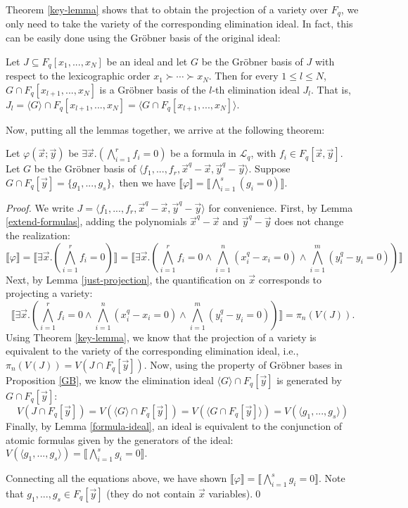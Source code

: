 \documentclass[envcountsect]{llncs}
\begin{document}
Theorem \ref{key-lemma} shows that to obtain the projection of a variety over $F_q$, we only need to take the variety of the corresponding elimination ideal. In fact, this can be easily done using the Gr\"obner basis of the original ideal:

\begin{proposition}\label{GB}
Let $J\subseteq F_q[x_1,...,x_N]$ be an ideal and let $G$ be the Gr\"obner basis of $J$ with respect to the lexicographic order $x_1\succ\cdots\succ x_N$. Then for every $1\leq l\leq N$, $G\cap F_q[x_{l+1},...,x_N]$ is a Gr\"obner basis of the $l$-th elimination ideal $J_l$. That is, $J_l=\langle G\rangle \cap F_q[x_{l+1},...,x_N]=\langle G\cap F_q[x_{l+1},...,x_N]\rangle.$
\end{proposition}

Now, putting all the lemmas together, we arrive at the following theorem:

\begin{theorem}\label{main-theorem}
Let $\varphi(\vec x;\vec y)$ be $\exists \vec x.(\bigwedge_{i=1}^r f_i=0)$ be a formula in $\mathcal{L}_q$, with $f_i\in F_q[\vec x, \vec y]$. Let $G$ be the Gr\"obner basis of $\langle f_1,...,f_r, \vec x^q-\vec x, \vec y^q-\vec y \rangle$. Suppose $G\cap F_q[\vec y] = \{g_1,...,g_s\},$ then we have $\llbracket \varphi \rrbracket = \llbracket \bigwedge_{i=1}^s (g_i=0)\rrbracket.$
\end{theorem}

\begin{proof}
We write $J=\langle f_1,...,f_r,\vec x^q-\vec x, \vec y^q-\vec y\rangle$ for convenience. First, by Lemma \ref{extend-formulas}, adding the polynomials $\vec x^q-\vec x$ and $\vec y^q -\vec y$ does not change the realization:
{$$\llbracket \varphi\rrbracket = \llbracket\exists \vec x.(\bigwedge_{i=1}^r f_i=0)\rrbracket = \llbracket\exists \vec x.(\bigwedge_{i=1}^r f_i=0\wedge \bigwedge_{i=1}^n( x_i^q- x_i = 0) \wedge \bigwedge_{i=1}^m (y_i^q- y_i=0))\rrbracket $$}Next, by Lemma \ref{just-projection}, the quantification on $\vec x$ corresponds to projecting a variety:
{$$\llbracket\exists \vec x.(\bigwedge_{i=1}^r f_i=0\wedge \bigwedge_{i=1}^n( x_i^q- x_i = 0) \wedge \bigwedge_{i=1}^m (y_i^q- y_i=0))\rrbracket= \pi_n(V(J)).$$}Using Theorem \ref{key-lemma}, we know that the projection of a variety is equivalent to the variety of the corresponding elimination ideal, i.e., $\pi_n(V(J)) =V(J\cap F_q[\vec y])$. Now, using the property of Gr\"obner bases in Proposition \ref{GB}, we know the elimination ideal $\langle G\rangle\cap F_q[\vec y]$ is generated by $G\cap F_q[\vec y]$:
{$$V(J\cap F_q[\vec y])=V(\langle G\rangle \cap F_q[\vec y]) = V(\langle G\cap F_q[\vec y] \rangle)= V(\langle g_1,...,g_s\rangle)$$}Finally, by Lemma \ref{formula-ideal}, an ideal is equivalent to the conjunction of atomic formulas given by the generators of the ideal: $V(\langle g_1,...,g_s\rangle)= \llbracket \bigwedge_{i=1}^s g_i=0\rrbracket.$

Connecting all the equations above, we have shown $\llbracket \varphi \rrbracket = \llbracket \bigwedge_{i=1}^s g_i=0\rrbracket.$ Note that $g_1,...,g_s\in F_q[\vec y]$ (they do not contain $\vec x$ variables).\qed
\end{proof}
\end{document}

